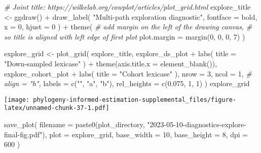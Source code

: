 \documentclass[
]{book}
\newenvironment{Shaded}{\begin{snugshade}}{\end{snugshade}}
\newcommand{\AttributeTok}[1]{\textcolor[rgb]{0.77,0.63,0.00}{#1}}
\newcommand{\CommentTok}[1]{\textcolor[rgb]{0.56,0.35,0.01}{\textit{#1}}}
\newcommand{\DecValTok}[1]{\textcolor[rgb]{0.00,0.00,0.81}{#1}}
\newcommand{\FloatTok}[1]{\textcolor[rgb]{0.00,0.00,0.81}{#1}}
\newcommand{\FunctionTok}[1]{\textcolor[rgb]{0.00,0.00,0.00}{#1}}
\newcommand{\NormalTok}[1]{#1}
\newcommand{\OtherTok}[1]{\textcolor[rgb]{0.56,0.35,0.01}{#1}}
\newcommand{\SpecialCharTok}[1]{\textcolor[rgb]{0.00,0.00,0.00}{#1}}
\newcommand{\StringTok}[1]{\textcolor[rgb]{0.31,0.60,0.02}{#1}}
\begin{document}
\begin{Shaded}
\begin{Highlighting}[]
\CommentTok{\# Joint title: https://wilkelab.org/cowplot/articles/plot\_grid.html}
\NormalTok{explore\_title }\OtherTok{\textless{}{-}} \FunctionTok{ggdraw}\NormalTok{() }\SpecialCharTok{+}
  \FunctionTok{draw\_label}\NormalTok{(}
    \StringTok{"Multi{-}path exploration diagnostic"}\NormalTok{,}
    \AttributeTok{fontface =} \StringTok{\textquotesingle{}bold\textquotesingle{}}\NormalTok{,}
    \AttributeTok{x =} \DecValTok{0}\NormalTok{,}
    \AttributeTok{hjust =} \DecValTok{0}
\NormalTok{  ) }\SpecialCharTok{+}
  \FunctionTok{theme}\NormalTok{(}
    \CommentTok{\# add margin on the left of the drawing canvas,}
    \CommentTok{\# so title is aligned with left edge of first plot}
    \AttributeTok{plot.margin =} \FunctionTok{margin}\NormalTok{(}\DecValTok{0}\NormalTok{, }\DecValTok{0}\NormalTok{, }\DecValTok{0}\NormalTok{, }\DecValTok{7}\NormalTok{)}
\NormalTok{  )}

\NormalTok{explore\_grid }\OtherTok{\textless{}{-}} \FunctionTok{plot\_grid}\NormalTok{(}
\NormalTok{  explore\_title,}
\NormalTok{  explore\_ds\_plot }\SpecialCharTok{+}
    \FunctionTok{labs}\NormalTok{(}
      \AttributeTok{title =} \StringTok{"Down{-}sampled lexicase"}
\NormalTok{    ) }\SpecialCharTok{+}
    \FunctionTok{theme}\NormalTok{(}\AttributeTok{axis.title.x =} \FunctionTok{element\_blank}\NormalTok{()),}
\NormalTok{  explore\_cohort\_plot }\SpecialCharTok{+}
    \FunctionTok{labs}\NormalTok{(}
      \AttributeTok{title =} \StringTok{"Cohort lexicase"}
\NormalTok{    ),}
  \AttributeTok{nrow =} \DecValTok{3}\NormalTok{,}
  \AttributeTok{ncol =} \DecValTok{1}\NormalTok{,}
  \CommentTok{\# align = "h",}
  \AttributeTok{labels =} \FunctionTok{c}\NormalTok{(}\StringTok{""}\NormalTok{, }\StringTok{"a"}\NormalTok{, }\StringTok{"b"}\NormalTok{),}
  \AttributeTok{rel\_heights =} \FunctionTok{c}\NormalTok{(}\FloatTok{0.075}\NormalTok{, }\DecValTok{1}\NormalTok{, }\DecValTok{1}\NormalTok{)}
\NormalTok{)}
\NormalTok{explore\_grid}
\end{Highlighting}
\end{Shaded}

\texttt{[image: phylogeny-informed-estimation-supplemental\_files/figure-latex/unnamed-chunk-37-1.pdf]}

\begin{Shaded}
\begin{Highlighting}[]
\FunctionTok{save\_plot}\NormalTok{(}
  \AttributeTok{filename =} \FunctionTok{paste0}\NormalTok{(plot\_directory, }\StringTok{"2023{-}05{-}10{-}diagnostics{-}explore{-}final{-}fig.pdf"}\NormalTok{),}
  \AttributeTok{plot =}\NormalTok{ explore\_grid,}
  \AttributeTok{base\_width =} \DecValTok{10}\NormalTok{,}
  \AttributeTok{base\_height =} \DecValTok{8}\NormalTok{,}
  \AttributeTok{dpi =} \DecValTok{600}
\NormalTok{)}
\end{Highlighting}
\end{Shaded}
\end{document}
